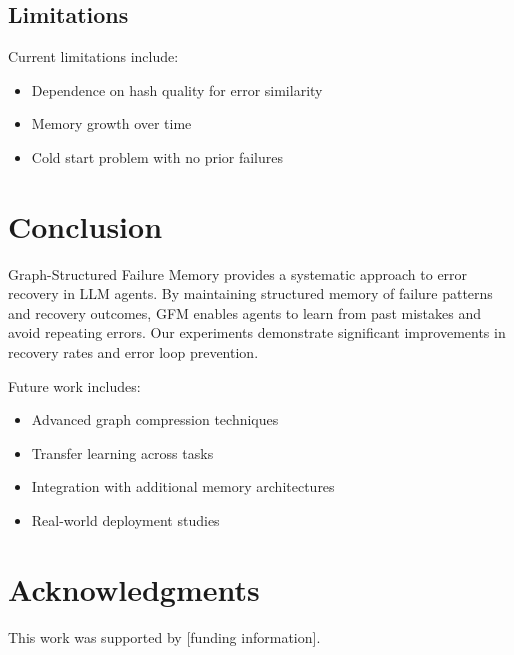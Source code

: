 \documentclass{conference}
\begin{document}
\subsection{Limitations}
Current limitations include:
\begin{itemize}
    \item Dependence on hash quality for error similarity
    \item Memory growth over time
    \item Cold start problem with no prior failures
\end{itemize}

\section{Conclusion}
Graph-Structured Failure Memory provides a systematic approach to error recovery in LLM agents. By maintaining structured memory of failure patterns and recovery outcomes, GFM enables agents to learn from past mistakes and avoid repeating errors. Our experiments demonstrate significant improvements in recovery rates and error loop prevention.

Future work includes:
\begin{itemize}
    \item Advanced graph compression techniques
    \item Transfer learning across tasks
    \item Integration with additional memory architectures
    \item Real-world deployment studies
\end{itemize}

\section*{Acknowledgments}
This work was supported by [funding information].



\end{document}
